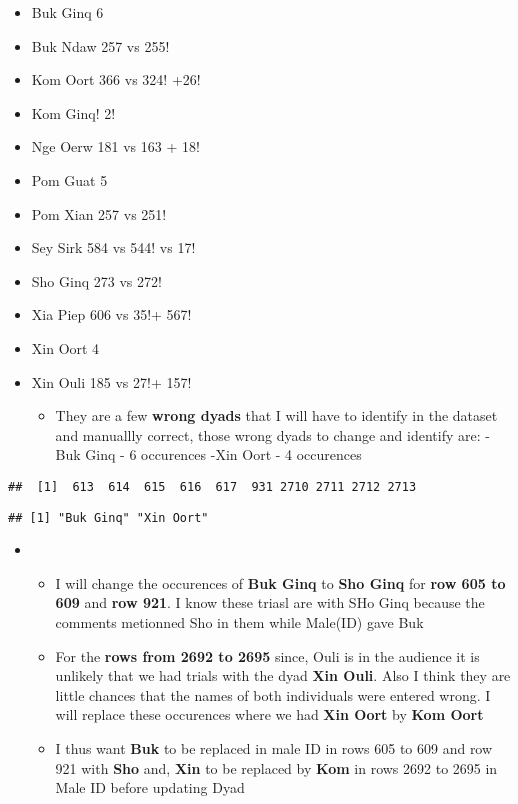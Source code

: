 \documentclass[
]{article}
\providecommand{\tightlist}{%
  \setlength{\itemsep}{0pt}\setlength{\parskip}{0pt}}
\begin{document}
\begin{itemize}
\item
  Buk Ginq 6
\item
  Buk Ndaw 257 vs 255!
\item
  Kom Oort 366 vs 324! +26!
\item
  Kom Ginq! 2!
\item
  Nge Oerw 181 vs 163 + 18!
\item
  Pom Guat 5
\item
  Pom Xian 257 vs 251!
\item
  Sey Sirk 584 vs 544! vs 17!
\item
  Sho Ginq 273 vs 272!
\item
  Xia Piep 606 vs 35!+ 567!
\item
  Xin Oort 4
\item
  Xin Ouli 185 vs 27!+ 157!

  \begin{itemize}
  \tightlist
  \item
    They are a few \textbf{wrong dyads} that I will have to identify in
    the dataset and manuallly correct, those wrong dyads to change and
    identify are: -Buk Ginq - 6 occurences -Xin Oort - 4 occurences
  \end{itemize}
\end{itemize}

\begin{verbatim}
##  [1]  613  614  615  616  617  931 2710 2711 2712 2713
\end{verbatim}

\begin{verbatim}
## [1] "Buk Ginq" "Xin Oort"
\end{verbatim}

\begin{itemize}
\item
  \begin{itemize}
  \item
    I will change the occurences of \textbf{Buk Ginq} to \textbf{Sho
    Ginq} for \textbf{row 605 to 609} and \textbf{row 921}. I know these
    triasl are with SHo Ginq because the comments metionned Sho in them
    while Male(ID) gave Buk
  \item
    For the \textbf{rows from 2692 to 2695} since, Ouli is in the
    audience it is unlikely that we had trials with the dyad \textbf{Xin
    Ouli}. Also I think they are little chances that the names of both
    individuals were entered wrong. I will replace these occurences
    where we had \textbf{Xin Oort} by \textbf{Kom Oort}
  \item
    I thus want \textbf{Buk} to be replaced in male ID in rows 605 to
    609 and row 921 with \textbf{Sho} and, \textbf{Xin} to be replaced
    by \textbf{Kom} in rows 2692 to 2695 in Male ID before updating Dyad
  \end{itemize}
\end{itemize}
\end{document}
